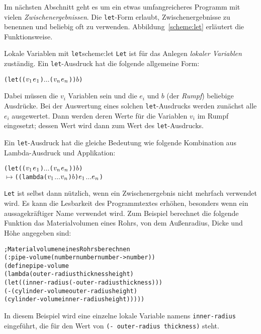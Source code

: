  Im nächsten Abschnitt
geht es um ein etwas umfangreicheres Programm mit vielen
\textit{Zwischenergebnissen}.  Die
\texttt{let}-Form erlaubt, Zwischenergebnisse zu benennen und beliebig
oft zu verwenden.  Abbildung~\ref{scheme:let} erläutert die
Funktionsweise.
%
\begin{feature}{Lokale Variablen mit \texttt{let}}{scheme:let}
\texttt{Let} ist für das Anlegen \textit{lokaler
  Variablen} zuständig.  Ein \texttt{let}-Ausdruck hat die folgende
allgemeine Form:
%
\begin{alltt}
(let ((\(v\sb{1}\) \(e\sb{1}\)) \(\ldots\) (\(v\sb{n}\) \(e\sb{n}\))) \(b\))
\end{alltt}
%
Dabei müssen die $v_i$ Variablen sein und die $e_i$ und
$b$ (der \textit{Rumpf}) beliebige Ausdrücke.  Bei der Auswertung
eines solchen \texttt{let}-Ausdrucks werden zunächst alle $e_i$
ausgewertet.  Dann werden deren Werte für die Variablen $v_i$ im Rumpf
eingesetzt; dessen Wert wird dann zum Wert des \texttt{let}-Ausdrucks.

Ein \texttt{let}-Ausdruck hat die gleiche Bedeutung wie folgende
Kombination aus Lambda-Ausdruck und Applikation:
%
\begin{alltt}
(let ((\(v\sb{1}\) \(e\sb{1}\)) \(\ldots\) (\(v\sb{n}\) \(e\sb{n}\))) \(b\))
\(\mapsto\) ((lambda (\(v\sb{1}\) \(\ldots\) \(v\sb{n}\)) \(b\)) \(e\sb{1}\) \(\ldots\) \(e\sb{n}\))
\end{alltt}
%
\end{feature}
%
\texttt{Let} ist selbst dann nützlich, wenn ein Zwischenergebnis nicht
mehrfach verwendet wird.  Es kann die Lesbarkeit des Programmtextes
erhöhen, besonders wenn ein aussagekräftiger Name verwendet wird.
Zum Beispiel berechnet die folgende Funktion das Materialvolumen eines
Rohrs, von dem Außenradius, Dicke und Höhe angegeben sind:
%
\begin{alltt}
; Materialvolumen eines Rohrs berechnen
(: pipe-volume (number number number -> number))
(define pipe-volume
  (lambda (outer-radius thickness height)
    (let ((inner-radius (- outer-radius thickness)))
      (- (cylinder-volume outer-radius height)
         (cylinder-volume inner-radius height)))))
\end{alltt}
%
In diesem Beispiel wird eine einzelne lokale Variable namens
\texttt{inner-radius} eingeführt, die für den Wert von \texttt{(-
  outer-radius thickness)} steht.

